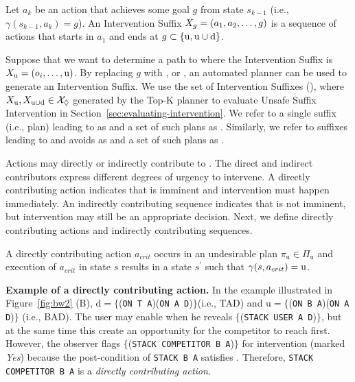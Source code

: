 \begin{definition}
  \label{def:suffix}
  Let $a_k$ be an action that achieves some goal $g$ from state $s_{k-1}$ (i.e., $\gamma(s_{k-1}, a_k) = g$).
An Intervention Suffix $X_g = (a_1, a_2, \ldots, g)$ is a sequence of actions that starts in $a_1$ and ends at
 $g \subset \{\mathrm{u}, \mathrm{u}\cup\mathrm{d} \} $.
\end{definition}

Suppose that we want to determine a path to \undesired where the Intervention Suffix is $X_{\mathrm{u}} = (o_i, \ldots, \mathrm{u})$.
By replacing $g$ with \undesired, or \dandu, an automated planner can be used to generate an Intervention Suffix.
We use the set of Intervention Suffixes (\Suffixes), where $X_\mathrm{u}, X_{\mathrm{u}\cup\mathrm{d}} \in \mathcal{X}_\Diamond$ generated by the Top-K planner \cite{riabov2014} to evaluate Unsafe Suffix Intervention in Section~\ref{sec:evaluating-intervention}.
We refer to a single suffix (i.e., plan) leading to \undesired as \planUndesired and a set of such plans as \PlansUndesired.
Similarly, we refer to suffixes leading to \desired and avoids \undesired as \planDesired and a set of such plans as \PlansDesired.

Actions may directly or indirectly contribute to \undesired.
The direct and indirect contributors express different degrees of urgency to intervene. 
A directly contributing action indicates that \undesired is imminent and intervention must happen immediately. 
An indirectly contributing sequence indicates that \undesired is not imminent, but
intervention may still be an appropriate decision.
Next, we define directly contributing actions and indirectly contributing sequences. 

\begin{definition}
\label{def:direct}
A \textnormal{directly contributing action} $a_{crit}$ occurs in an undesirable plan $\pi_{\mathrm{u}}\in \Pi_{\mathrm{u}}$ and execution of $a_{crit}$ in state $s$ results in a state $s^\prime$ such that $\gamma(s,a_{crit})=\mathrm{u}$. 
\end{definition}

\textbf{Example of a directly contributing action.} 
In the example illustrated in Figure~\ref{fig:bw2} (B), $\mathrm{d}=\lbrace$(\texttt{ON T A})(\texttt{ON A D})$\rbrace$(i.e., TAD) and $\mathrm{u}=\lbrace$(\texttt{ON B A})(\texttt{ON A D})$\rbrace$ (i.e., BAD). 
The user may enable \desired when he reveals $\lbrace$(\texttt{STACK USER A D})$\rbrace$, but at the same time this create an opportunity for the competitor to reach \undesired first.
However, the observer flags $\lbrace$(\texttt{STACK COMPETITOR B A})$\rbrace$ for intervention (marked \textit{Yes}) because the post-condition of \texttt{STACK B A} satisfies \undesired. Therefore, \texttt{STACK COMPETITOR B A} is a \textit{directly contributing action}.


